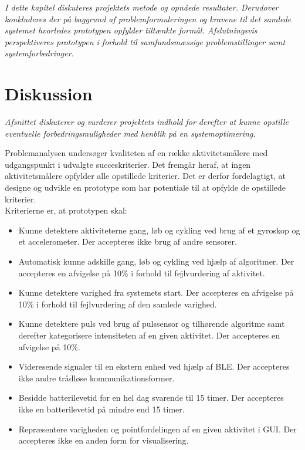 \textit{I dette kapitel diskuteres projektets metode og opnåede resultater. Derudover konkluderes der på baggrund af problemformuleringen og kravene til det samlede systemet hvorledes prototypen opfylder tiltænkte formål. Afslutningsvis perspektiveres prototypen i forhold til samfundsmæssige problemstillinger samt systemforbedringer.}

\section{Diskussion}\label{sec:diskussion}
\textit{Afsnittet diskuterer og vurderer projektets indhold for derefter at kunne opstille eventuelle forbedringsmuligheder med henblik på en systemoptimering.}

Problemanalysen undersøger kvaliteten af en række aktivitetsmålere med udgangspunkt i udvalgte succeskriterier. Det fremgår heraf, at ingen aktivitetsmålere opfylder alle opstillede kriterier. Det er derfor fordelagtigt, at designe og udvikle en prototype som har potentiale til at opfylde de opstillede kriterier. \\
Kriterierne er, at prototypen skal:
\begin{itemize}
	\item Kunne detektere aktiviteterne gang, løb og cykling ved brug af et gyroskop og et accelerometer. Der accepteres ikke brug af andre sensorer.
	\item Automatisk kunne adskille gang, løb og cykling ved hjælp af algoritmer. Der accepteres en afvigelse på 10\% i forhold til fejlvurdering af aktivitet.
	\item Kunne detektere varighed fra systemets start. Der accepteres en afvigelse på 10\% i forhold til fejlvurdering af den samlede varighed.	
	\item Kunne detektere puls ved brug af pulssensor og tilhørende algoritme samt derefter kategorisere intensiteten af en given aktivitet. Der accepteres en afvigelse på 10\%.
	\item Videresende signaler til en ekstern enhed ved hjælp af BLE. Der accepteres ikke andre trådløse kommunikationsformer.
	\item Besidde batterilevetid for en hel dag svarende til 15 timer. Der accepteres ikke en batterilevetid på mindre end 15 timer.
	\item Repræsentere varigheden og pointfordelingen af en given aktivitet i GUI. Der accepteres ikke en anden form for visualisering.	
\end{itemize}

